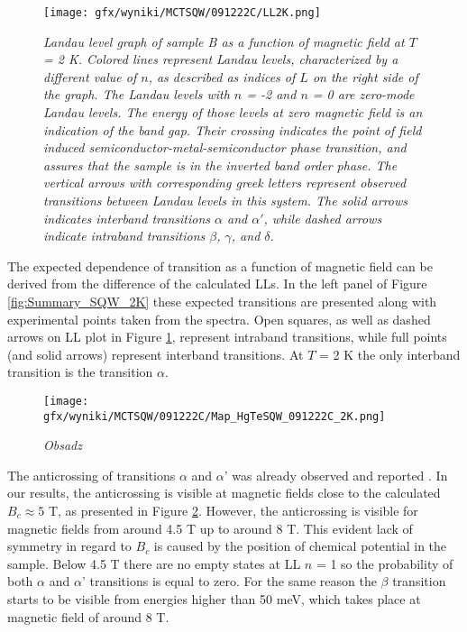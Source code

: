 \documentclass[titlepage,a4paper]{book}
\begin{document}
\begin{figure}[ht]
	\centering
	\texttt{[image: gfx/wyniki/MCTSQW/091222C/LL2K.png]}
	\vspace{-10pt}
	\caption{\textit{Landau level graph of sample B as a function of magnetic field at $T$ = 2 K. Colored lines represent Landau levels, characterized by a different value of $n$, as described as indices of $L$ on the right side of the graph. The Landau levels with $n$ = -2 and $n$ = 0 are zero-mode Landau levels. The energy of those levels at zero magnetic field is an indication of the band gap. Their crossing indicates the point of field induced semiconductor-metal-semiconductor phase transition, and assures that the sample is in the inverted band order phase. The vertical arrows with corresponding greek letters represent observed transitions between Landau levels in this system. The solid arrows indicates interband transitions $\alpha$ and $\alpha'$, while dashed arrows indicate intraband transitions $\beta$, $\gamma$, and $\delta$.}}
	\label{fig:LL_SQW_2K}
\end{figure}

The expected dependence of transition as a function of magnetic field can be derived from the difference of the calculated LLs. In the left panel of Figure \ref{fig:Summary_SQW_2K} these expected transitions are presented along with experimental points taken from the spectra. Open squares, as well as dashed arrows on LL plot in Figure \ref{fig:LL_SQW_2K}, represent intraband transitions, while full points (and solid arrows) represent interband transitions. At $T$ = 2 K the only interband transition is the transition $\alpha$.

\begin{figure}[ht]
	\centering
	\texttt{[image: gfx/wyniki/MCTSQW/091222C/Map\_HgTeSQW\_091222C\_2K.png]}
	\vspace{-10pt}
	\caption{\textit{Obsadz}}
	\label{fig:Map_SQW_2K}
\end{figure}

The anticrossing of transitions $\alpha$ and $\alpha$' was already observed and reported \cite{Orlita_MCT_QW}\cite{Zholudev_MCT_QW}\cite{Zholudev_MCT_QW_anticrossing}. In our results, the anticrossing is visible at magnetic fields close to the calculated $B_c \approx 5$ T, as presented in Figure \ref{fig:Map_SQW_2K}. However, the anticrossing is visible for magnetic fields from around 4.5 T up to around 8 T. This evident lack of symmetry in regard to $B_c$ is caused by the position of chemical potential in the sample. Below 4.5 T there are no empty states at LL $n$ = 1 so the probability of both $\alpha$ and $\alpha$' transitions is equal to zero. For the same reason the $\beta$ transition starts to be visible from energies higher than 50 meV, which takes place at magnetic field of around 8 T.
\end{document}
